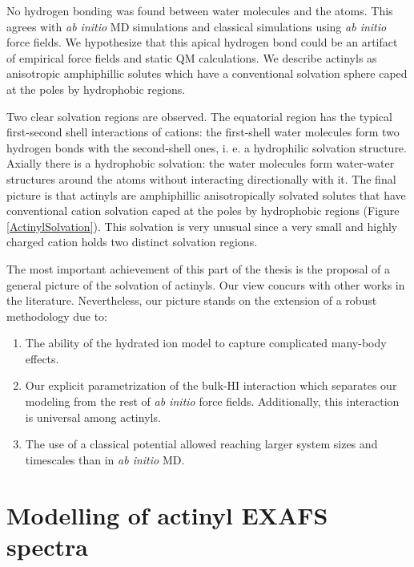No hydrogen bonding was found between water molecules and the \oyl atoms. This agrees with 
\textit{ab initio} MD 
simulations\cite{JACS_Buhl_2005,JChemPhys_Nichols_2008,JPhysChemA_Frick_2009} and classical 
simulations using 
\textit{ab initio} force 
fields\cite{JACS_Roos_2005,PhysChemChemPhys_Pomogaev_2013,JPhysChemB_Tiwari_2012}. We 
hypothesize that this apical hydrogen bond could be an artifact 
of empirical force fields\cite{JMolStr_Wipff_1996,JPhysChem_Wipff_1993,JPhysChemA_Kerisit_2013} and 
static QM calculations\cite{ChemPhys_Siboulet_2006}. We describe actinyls as anisotropic 
amphiphillic solutes which have a conventional solvation sphere caped at the poles by hydrophobic 
regions. 


Two clear solvation regions are observed. The equatorial region has the typical first-second 
shell
interactions of cations: the first-shell water mo\-le\-cu\-les form two hydrogen bonds with 
the 
second-shell ones, 
i. e. a 
hydrophilic solvation structure. Axially there is a hydrophobic solvation: the water 
mo\-le\-cu\-les 
form 
water-water structures around the \oyl atoms without interacting directionally with it. The final 
picture is that actinyls are amphiphillic anisotropically solvated solutes that have conventional 
cation solvation caped at the poles by hydrophobic regions (Figure \ref{ActinylSolvation}). This 
solvation is very unusual since a very small and highly charged cation holds two distinct
solvation regions.  

The most important achievement of this part of the thesis is the proposal of a general picture 
of the solvation of actinyls. Our view concurs with other works in the 
literature\cite{JACS_Roos_2005,PhysChemChemPhys_Pomogaev_2013,JPhysChemB_Tiwari_2012,JACS_Buhl_2005,
JChemPhys_Nichols_2008,JPhysChemA_Frick_2009}. Nevertheless, our picture stands on the extension of 
a robust methodology due to:
\begin{enumerate}
 \item The ability of the hydrated ion model 
to capture complicated 
many-body effects. 
 \item Our explicit parametrization of 
the bulk-HI interaction which separates our modeling from the rest of \textit{ab 
initio} force fields. Additionally, this interaction is universal among actinyls. 
\item The use of a classical potential allowed reaching larger 
system sizes and timescales than in \textit{ab initio} MD.
\end{enumerate}
\section[Modelling of actinyl EXAFS spectra]{Modelling of actinyl EXAFS 
spectra}\label{ModelXASSpectra}


